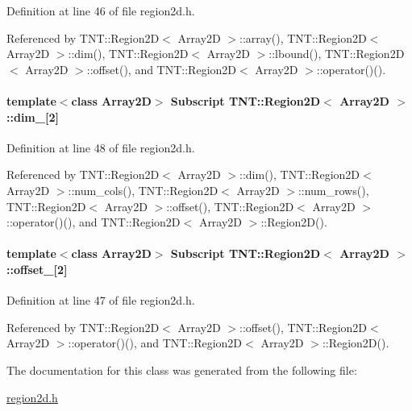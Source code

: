 Definition at line 46 of file region2d.h.



Referenced by TNT::Region2D$<$ Array2D $>$::array(), TNT::Region2D$<$ Array2D $>$::dim(), TNT::Region2D$<$ Array2D $>$::lbound(), TNT::Region2D$<$ Array2D $>$::offset(), and TNT::Region2D$<$ Array2D $>$::operator()().

\paragraph[{dim\_\-}]{\setlength{\rightskip}{0pt plus 5cm}template$<$class Array2D$>$ {\bf Subscript} {\bf TNT::Region2D}$<$ Array2D $>$::{\bf dim\_\-}\mbox{[}2\mbox{]}}\hfill\label{class_t_n_t_1_1_region2_d_a6fe119c6ecc8e92a22b5283d0ff9a01e}


Definition at line 48 of file region2d.h.



Referenced by TNT::Region2D$<$ Array2D $>$::dim(), TNT::Region2D$<$ Array2D $>$::num\_\-cols(), TNT::Region2D$<$ Array2D $>$::num\_\-rows(), TNT::Region2D$<$ Array2D $>$::offset(), TNT::Region2D$<$ Array2D $>$::operator()(), and TNT::Region2D$<$ Array2D $>$::Region2D().

\paragraph[{offset\_\-}]{\setlength{\rightskip}{0pt plus 5cm}template$<$class Array2D$>$ {\bf Subscript} {\bf TNT::Region2D}$<$ Array2D $>$::{\bf offset\_\-}\mbox{[}2\mbox{]}}\hfill\label{class_t_n_t_1_1_region2_d_a8e2c49eaa2a10d976de943a3df8c1989}


Definition at line 47 of file region2d.h.



Referenced by TNT::Region2D$<$ Array2D $>$::offset(), TNT::Region2D$<$ Array2D $>$::operator()(), and TNT::Region2D$<$ Array2D $>$::Region2D().



The documentation for this class was generated from the following file:\begin{DoxyCompactItemize}
\item 
\hyperlink{region2d_8h}{region2d.h}\end{DoxyCompactItemize}
